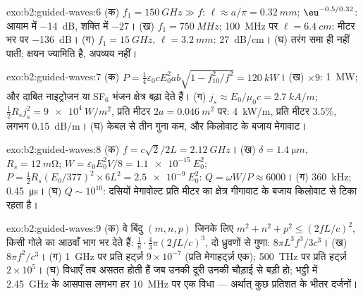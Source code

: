 \begin{solution}{exo:b2:guided-waves:6}
(क) $f_1 = \qty{150}{GHz} \gg f$: $\ell \approx a/\pi = \qty{0.32}{mm}$; $\eu^{-0.5/0.32}$:
आयाम में \qty{-14}{dB}, शक्ति में $-27$। (ख) $f_1 = \qty{750}{MHz}$; \qty{100}{MHz} पर
$\ell = \qty{6.4}{cm}$: मीटर भर पर \qty{-136}{dB}। (ग) $f_1 = \qty{15}{GHz}$, $\ell =
\qty{3.2}{mm}$: \qty{27}{dB/cm}। (घ) तरंग समा ही नहीं पाती; क्षयन
ज्यामिति है, अपव्यय नहीं।
\end{solution}

\begin{solution}{exo:b2:guided-waves:7}
(क) $P = \tfrac14\varepsilon_0cE_0^2ab\sqrt{1 - f_{10}^2/f^2} = \qty{120}{kW}$। (ख) $\times9$:
\qty{1}{MW}; और दाबित नाइट्रोजन या SF$_6$ भंजन क्षेत्र बढ़ा देते हैं। (ग)
$j_s \approx E_0/\mu_0c = \qty{2.7}{kA/m}$; $\tfrac12R_sj_s^2 = \qty{9e4}{W/m^2}$, प्रति मीटर $2a =
\qty{0.046}{m^2}$ पर: \qty{4}{kW/m}, प्रति मीटर $3.5\%$, लगभग \qty{0.15}{dB/m}।
(घ) केबल से तीन गुना कम, और किलोवाट के बजाय
मेगावाट।
\end{solution}

\begin{solution}{exo:b2:guided-waves:8}
(क) $f = c\sqrt2/2L = \qty{2.12}{GHz}$। (ख) $\delta = \qty{1.4}{\micro m}$, $R_s = \qty{12}{m\ohm}$;
$W = \varepsilon_0E_0^2V/8 = \qty{1.1e-15}{}E_0^2$; $P = \tfrac12R_s(E_0/377)^2 \times 6L^2 =
\qty{2.5e-9}{}E_0^2$: $Q = \omega W/P \approx 6000$। (ग) \qty{360}{kHz}; \qty{0.45}{\micro s}। (घ)
$Q \sim 10^{10}$: दसियों मेगावोल्ट प्रति मीटर का क्षेत्र गीगावाट के बजाय
किलोवाट से टिका रहता है।
\end{solution}

\begin{solution}{exo:b2:guided-waves:9}
(क) वे बिंदु $(m, n, p)$ जिनके लिए $m^2 + n^2 + p^2 \le (2fL/c)^2$, किसी गोले का
आठवाँ भाग भर देते हैं: $\tfrac18\cdot\tfrac43\pi(2fL/c)^3$, दो ध्रुवणों से गुणा:
$8\pi L^3f^3/3c^3$। (ख) $8\pi f^2/c^3$। (ग) \qty{1}{GHz} पर प्रति हर्ट्ज़ $9 \times 10^{-7}$ (प्रति
मेगाहर्ट्ज़ एक); \qty{500}{THz} पर प्रति हर्ट्ज़ $2 \times 10^5$। (घ) विधाएँ तब असतत
होती हैं जब उनकी दूरी उनकी चौड़ाई से बड़ी हो; भट्ठी में \qty{2.45}{GHz} के
आसपास लगभग हर \qty{10}{MHz} पर एक विधा --- अर्थात् कुछ प्रतिशत के भीतर
दर्जनों।
\end{solution}

